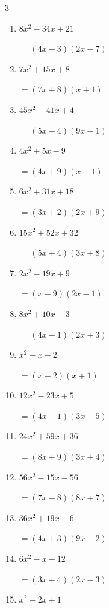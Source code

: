 \begin{multicols}{3}
\begin{enumerate}
\columnbreak %

\resetques

  \item $8x^{2}-34x+21$

        $=(4x-3)(2x-7)$

  \item $7x^{2}+15x+8$

        $=(7x+8)(x+1)$

  \item $45x^{2}-41x+4$

        $=(5x-4)(9x-1)$

  \item $4x^{2}+5x-9$

        $=(4x+9)(x-1)$

  \item $6x^{2}+31x+18$

        $=(3x+2)(2x+9)$

  \item $15x^{2}+52x+32$

        $=(5x+4)(3x+8)$

  \item $2x^{2}-19x+9$

        $=(x-9)(2x-1)$

  \item $8x^{2}+10x-3$

        $=(4x-1)(2x+3)$

  \item $x^{2}-x-2$

        $=(x-2)(x+1)$

  \item $12x^{2}-23x+5$

        $=(4x-1)(3x-5)$

\columnbreak %

  \item $24x^{2}+59x+36$

        $=(8x+9)(3x+4)$

  \item $56x^{2}-15x-56$

        $=(7x-8)(8x+7)$

  \item $36x^{2}+19x-6$

        $=(4x+3)(9x-2)$

  \item $6x^{2}-x-12$

        $=(3x+4)(2x-3)$

  \item $x^{2}-2x+1$


\end{enumerate}
\end{multicols}
